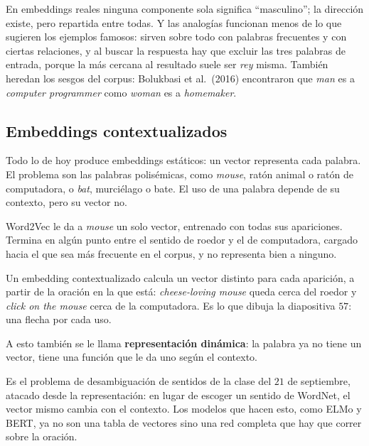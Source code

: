 \documentclass[11pt,letterpaper]{article}
\begin{document}
\begin{ojo}
    En embeddings reales ninguna componente sola significa
    ``masculino''; la dirección existe, pero repartida entre todas. Y
    las analogías funcionan menos de lo que sugieren los ejemplos
    famosos: sirven sobre todo con palabras frecuentes y con ciertas
    relaciones, y al buscar la respuesta hay que excluir las tres
    palabras de entrada, porque la más cercana al resultado suele ser
    \textit{rey} misma. También heredan los sesgos del corpus:
    Bolukbasi et al.\ (2016) encontraron que \textit{man} es a
    \textit{computer programmer} como \textit{woman} es a
    \textit{homemaker}.
\end{ojo}


\subsection*{Embeddings contextualizados}

Todo lo de hoy produce embeddings estáticos: un vector representa cada
palabra. El problema son las palabras polisémicas, como
\textit{mouse}, ratón animal o ratón de computadora, o \textit{bat},
murciélago o bate. El uso de una palabra depende de su contexto, pero
su vector no.

\begin{ejemplo}
    Word2Vec le da a \textit{mouse} un solo vector, entrenado con todas
    sus apariciones. Termina en algún punto entre el sentido de roedor
    y el de computadora, cargado hacia el que sea más frecuente en el
    corpus, y no representa bien a ninguno.

    Un embedding contextualizado calcula un vector distinto para cada
    aparición, a partir de la oración en la que está:
    \textit{cheese-loving mouse} queda cerca del roedor y
    \textit{click on the mouse} cerca de la computadora. Es lo que
    dibuja la diapositiva $57$: una flecha por cada uso.
\end{ejemplo}

A esto también se le llama \textbf{representación dinámica}: la
palabra ya no tiene un vector, tiene una función que le da uno según el
contexto.

\begin{idea}
    Es el problema de desambiguación de sentidos de la clase del $21$
    de septiembre, atacado desde la representación: en lugar de escoger
    un sentido de WordNet, el vector mismo cambia con el contexto. Los
    modelos que hacen esto, como ELMo y BERT, ya no son una tabla de
    vectores sino una red completa que hay que correr sobre la oración.
\end{idea}
\end{document}
